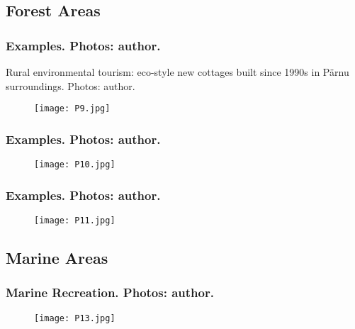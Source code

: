 \documentclass[pdflatex,compress,8pt,
	xcolor={dvipsnames,dvipsnames,svgnames,x11names,table},
	hyperref={	
	breaklinks = true, 
	pdfauthor={Lemenkova Polina}, 
	pdfsubject={Preentation}, 
	pdfcreator={Lemenkova Polina}, 
	pdfproducer={Lemenkova Polina}, 
	colorlinks=true,
	linkcolor=Tomato, 
	citecolor=DeepPink3, 
	urlcolor = NavyBlue, 
	breaklinks = true}]{beamer}
\begin{document}
\subsection{Forest Areas}
\begin{frame}\frametitle{Examples. Photos: author.}
\vspace{3em}
Rural environmental tourism: eco-style new cottages built since 1990s in Pärnu surroundings. Photos: author.
\begin{figure}[H]
	\centering
		\texttt{[image: P9.jpg]}
\end{figure}
\end{frame} 

\begin{frame}\frametitle{Examples. Photos: author.}
\vspace{3em}
\begin{figure}[H]
	\centering
		\texttt{[image: P10.jpg]}
\end{figure}
\end{frame}

\begin{frame}\frametitle{Examples. Photos: author.}
\vspace{3em}
\begin{figure}[H]
	\centering
		\texttt{[image: P11.jpg]}
\end{figure}
\end{frame}

\subsection{Marine Areas}
\begin{frame}\frametitle{Marine Recreation. Photos: author.}
\vspace{3em}
\begin{figure}[H]
	\centering
		\texttt{[image: P13.jpg]}
\end{figure}
\end{frame}
 
\end{document}
